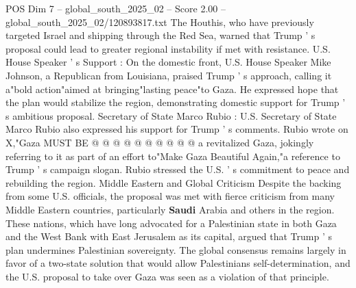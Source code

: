 \begin{textsample}{POS Dim 7 – global\_south\_2025\_02 – Score 2.00 – global\_south\_2025\_02/120893817.txt}
The Houthis, who have previously targeted Israel and shipping through the Red Sea, warned that Trump ' s proposal could lead to greater regional instability if met with resistance.
U.S.
House Speaker ' s Support : On the domestic front, U.S.
House Speaker Mike Johnson, a Republican from Louisiana, praised Trump ' s approach, calling it a"bold action"aimed at bringing"lasting peace"to Gaza.
He expressed hope that the plan would stabilize the region, demonstrating domestic support for Trump ' s ambitious proposal.
Secretary of State Marco Rubio : U.S.
Secretary of State Marco Rubio also expressed his support for Trump ' s comments.
Rubio wrote on X,"Gaza MUST BE @ @ @ @ @ @ @ @ @ @ a revitalized Gaza, jokingly referring to it as part of an effort to"Make Gaza Beautiful Again,"a reference to Trump ' s campaign slogan.
Rubio stressed the U.S. ' s commitment to peace and rebuilding the region.
Middle Eastern and Global Criticism Despite the backing from some U.S. officials, the proposal was met with fierce criticism from many Middle Eastern countries, particularly \textbf{Saudi} Arabia and others in the region.
These nations, which have long advocated for a Palestinian state in both Gaza and the West Bank with East Jerusalem as its capital, argued that Trump ' s plan undermines Palestinian sovereignty.
The global consensus remains largely in favor of a two-state solution that would allow Palestinians self-determination, and the U.S. proposal to take over Gaza was seen as a violation of that principle.

\end{textsample}
